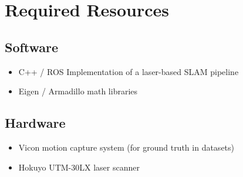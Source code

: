 \section{Required Resources}

\subsection*{Software}
\begin{itemize}
\item C++ / ROS Implementation of a laser-based SLAM pipeline
\item Eigen / Armadillo math libraries
\end{itemize}

\subsection*{Hardware}
\begin{itemize}
\item Vicon motion capture system (for ground truth in datasets)
\item Hokuyo UTM-30LX laser scanner
\end{itemize}
